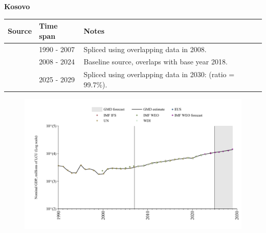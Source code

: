 \documentclass[12pt,a4paper,landscape]{article}
\begin{document}
\begin{adjustbox}{max totalsize={\paperwidth}{\paperheight},center}
\begin{minipage}[t][\textheight][t]{\textwidth}
\vspace*{0.5cm}
{}
\begin{center}
{\Large\bfseries Kosovo}
\end{center}
\vspace{0.5cm}
\begin{table}[H]
\centering
\small
\begin{tabular}{|l|l|l|}
\hline
\textbf{Source} & \textbf{Time span} & \textbf{Notes} \\
\hline
\rowcolor{white}\cite{UN}& 1990 - 2007 &Spliced using overlapping data in 2008.\\
\rowcolor{lightgray}\cite{EUS}& 2008 - 2024 &Baseline source, overlaps with base year 2018.\\
\rowcolor{white}\cite{IMF_WEO_forecast}& 2025 - 2029 &Spliced using overlapping data in 2030: (ratio = 99.7\%).\\
\hline
\end{tabular}
\end{table}
\begin{figure}[H]
\centering
\includegraphics[width=\textwidth,height=0.6\textheight,keepaspectratio]{graphs/XKX_nGDP.pdf}
\end{figure}
\end{minipage}
\end{adjustbox}
\end{document}
